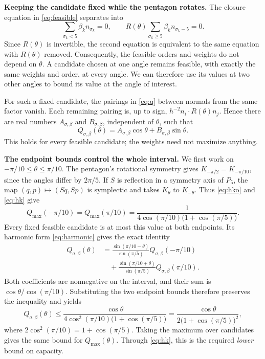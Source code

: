 \documentclass[11pt,a4paper]{article}
\begin{document}
\newpage
\textbf{Keeping the candidate fixed while the pentagon rotates.}
The closure equation in \eqref{eq:feasible} separates into
\[
 \sum_{\sigma_k<5}\beta_k n_{\sigma_k}=0,
 \qquad
 R(\theta)\sum_{\sigma_k\ge5}\beta_k n_{\sigma_k-5}=0.
\]
Since $R(\theta)$ is invertible, the second equation is equivalent to the
same equation with $R(\theta)$ removed. Consequently, the feasible orders
and weights do not depend on $\theta$. A candidate chosen at one angle
remains feasible, with exactly the same weights and order, at every angle.
We can therefore use its values at two other angles to bound its value
at the angle of interest.

For such a fixed candidate, the pairings in \eqref{eq:q} between normals
from the same factor vanish. Each remaining pairing is, up to sign,
$h^{-2}n_i\cdot R(\theta)n_j$. Hence there are real numbers
$A_{\sigma,\beta}$ and $B_{\sigma,\beta}$, independent of $\theta$, such that
\begin{equation}\label{eq:harmonic}
 Q_{\sigma,\beta}(\theta)
 =A_{\sigma,\beta}\cos\theta+B_{\sigma,\beta}\sin\theta.
\end{equation}
This holds for every feasible candidate; the weights need not maximize
anything.

\textbf{The endpoint bounds control the whole interval.}
We first work on $-\pi/10\le\theta\le\pi/10$.
The pentagon's rotational symmetry gives
$K_{-\pi/2}=K_{-\pi/10}$, since the angles differ by $2\pi/5$.
If $S$ is reflection in a symmetry axis of $P_5$, the map
$(q,p)\mapsto(Sq,Sp)$ is symplectic and takes $K_\theta$ to $K_{-\theta}$.
Thus \eqref{eq:hko} and \eqref{eq:hk} give
\[
 Q_{\max}(-\pi/10)=Q_{\max}(\pi/10)
 =\frac{1}{4\cos(\pi/10)\bigl(1+\cos(\pi/5)\bigr)}.
\]
Every fixed feasible candidate is at most this value at both endpoints.
Its harmonic form \eqref{eq:harmonic} gives the exact identity
\begin{align*}
 Q_{\sigma,\beta}(\theta)
 &=\frac{\sin(\pi/10-\theta)}{\sin(\pi/5)}
       Q_{\sigma,\beta}(-\pi/10)\\
 &\hspace{1em}+\frac{\sin(\pi/10+\theta)}{\sin(\pi/5)}
       Q_{\sigma,\beta}(\pi/10).
\end{align*}
Both coefficients are nonnegative on the interval, and their sum is
$\cos\theta/\cos(\pi/10)$. Substituting the two endpoint bounds therefore
preserves the inequality and yields
\[
 Q_{\sigma,\beta}(\theta)
 \le\frac{\cos\theta}
 {4\cos^2(\pi/10)\bigl(1+\cos(\pi/5)\bigr)}
 =\frac{\cos\theta}{2\bigl(1+\cos(\pi/5)\bigr)^2},
\]
where $2\cos^2(\pi/10)=1+\cos(\pi/5)$.
Taking the maximum over candidates gives the same bound for
$Q_{\max}(\theta)$. Through \eqref{eq:hk}, this is the required
\emph{lower} bound on capacity.
\end{document}
